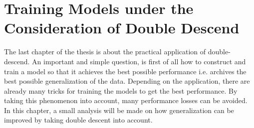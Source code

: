 \chapter{Training Models under the Consideration of Double Descend}
\label{train_dd}

The last chapter of the thesis is about the practical application of double-descend. An important and simple question, is first of all how to construct and train a model so that it achieves the best possible performance i.e. archives the best possible generalization of the data. Depending on the application, there are already many tricks for training the models to get the best performance. By taking this phenomenon into account, many performance losses can be avoided. In this chapter, a small analysis will be made on how generalization can be improved by taking double descent into account.\\
\\

